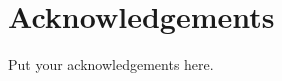 

\begingroup

\let\clearpage\relax
\let\cleardoublepage\relax
\let\cleardoublepage\relax

\chapter*{Acknowledgements} %

Put your acknowledgements here.\\

\endgroup
